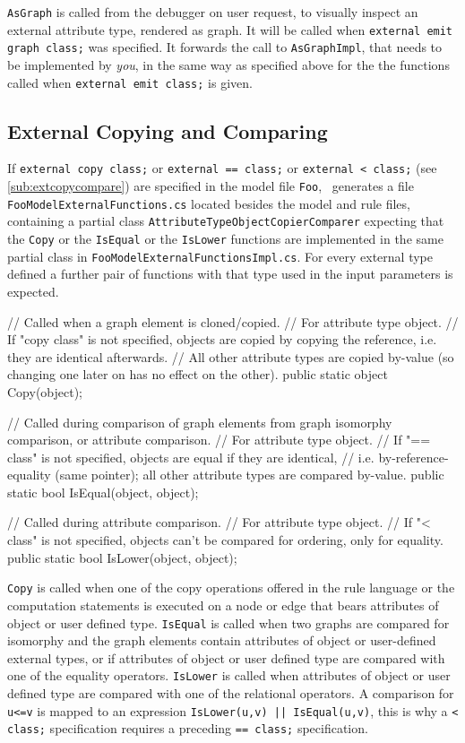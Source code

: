 \texttt{AsGraph} is called from the debugger on user request, to visually inspect an external attribute type, rendered as graph.
It will be called when \texttt{external emit graph class;} was specified.
It forwards the call to \texttt{AsGraphImpl}, that needs to be implemented by \emph{you}, in the same way as specified above for the the functions called when \texttt{external emit class;} is given.

\subsection*{External Copying and Comparing}\label{sub:apiextcopycompare}
If \texttt{external copy class;} or \texttt{external == class;} or \texttt{external < class;} (see \ref{sub:extcopycompare}) are specified in the model file \texttt{Foo},
\GrG~generates a file \texttt{FooModelExternalFunctions.cs} located besides the model and rule files,
containing a partial class \texttt{AttributeTypeObjectCopierComparer} expecting that the \texttt{Copy} or the \texttt{IsEqual} or the \texttt{IsLower} functions are implemented in the same partial class in \texttt{FooModelExternalFunctionsImpl.cs}.
For every external type defined a further pair of functions with that type used in the input parameters is expected.

\begin{csharplet}
// Called when a graph element is cloned/copied.
// For attribute type object.
// If "copy class" is not specified, objects are copied by copying the reference, i.e. they are identical afterwards.
// All other attribute types are copied by-value (so changing one later on has no effect on the other).
public static object Copy(object);

// Called during comparison of graph elements from graph isomorphy comparison, or attribute comparison.
// For attribute type object.
// If "== class" is not specified, objects are equal if they are identical,
// i.e. by-reference-equality (same pointer); all other attribute types are compared by-value.
public static bool IsEqual(object, object);

// Called during attribute comparison.
// For attribute type object.
// If "< class" is not specified, objects can't be compared for ordering, only for equality.
public static bool IsLower(object, object);
\end{csharplet}

\texttt{Copy} is called when one of the copy operations offered in the rule language or the computation statements is executed on a node or edge that bears attributes of object or user defined type.
\texttt{IsEqual} is called when two graphs are compared for isomorphy and the graph elements contain attributes of object or user-defined external types, or if attributes of object or user defined type are compared with one of the equality operators.
\texttt{IsLower} is called when attributes of object or user defined type are compared with one of the relational operators.
A comparison for \texttt{u<=v} is mapped to an expression \verb#IsLower(u,v) || IsEqual(u,v)#, this is why a \verb#< class;# specification requires a preceding \verb#== class;# specification.

